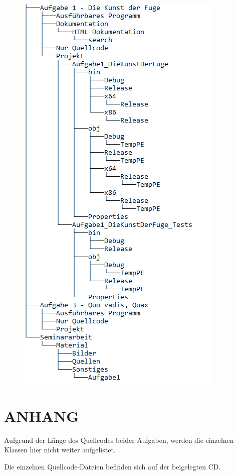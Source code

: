 \documentclass[a4paper,12pt]{article}
\begin{document}
\begin{figure}[H]
    \includegraphics[width=.7\linewidth]{Bilder/Sonstiges/CDVerzeichnis.png}
\end{figure}


\newpage
\section{ANHANG}
Aufgrund der Länge des Quellcodes beider Aufgaben, werden die einzelnen Klassen hier nicht weiter aufgelistet.

Die einzelnen Quellcode-Dateien befinden sich auf der beigelegten CD.
\end{document}
